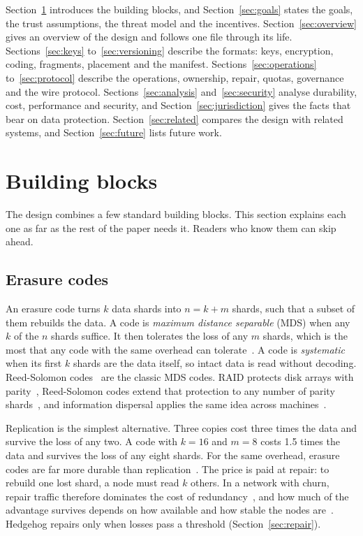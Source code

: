\documentclass[10pt,a4paper,final]{article}
\begin{document}
Section~\ref{sec:background} introduces the building blocks, and Section~\ref{sec:goals} states the goals, the
trust assumptions, the threat model and the incentives. Section~\ref{sec:overview} gives an overview of the design
and follows one file through its life. Sections~\ref{sec:keys} to~\ref{sec:versioning} describe the formats: keys,
encryption, coding, fragments, placement and the manifest. Sections~\ref{sec:operations} to~\ref{sec:protocol}
describe the operations, ownership, repair, quotas, governance and the wire protocol. Sections~\ref{sec:analysis}
and~\ref{sec:security} analyse durability, cost, performance and security, and Section~\ref{sec:jurisdiction} gives
the facts that bear on data protection. Section~\ref{sec:related} compares the design with related systems, and
Section~\ref{sec:future} lists future work.

\section{Building blocks}
\label{sec:background}

The design combines a few standard building blocks. This section explains each one as far as the rest of the paper
needs it. Readers who know them can skip ahead.

\subsection{Erasure codes}

An erasure code turns $k$ data shards into $n = k + m$ shards, such that a subset of them rebuilds the data. A code
is \emph{maximum distance separable} (MDS) when any $k$ of the $n$ shards suffice. It then tolerates the loss of any
$m$ shards, which is the most that any code with the same overhead can tolerate~\cite{macwilliams1977}. A code is
\emph{systematic} when its first $k$ shards are the data itself, so intact data is read without decoding.
Reed-Solomon codes~\cite{reed1960} are the classic MDS codes. RAID protects disk arrays with
parity~\cite{patterson1988}, Reed-Solomon codes extend that protection to any number of parity
shards~\cite{plank1997}, and information dispersal applies the same idea across machines~\cite{rabin1989}.

Replication is the simplest alternative. Three copies cost three times the data and survive the loss of any two. A
code with $k = 16$ and $m = 8$ costs 1.5 times the data and survives the loss of any eight shards. For the same
overhead, erasure codes are far more durable than replication~\cite{weatherspoon2002}. The price is paid at repair:
to rebuild one lost shard, a node must read $k$ others. In a network with churn, repair traffic therefore dominates
the cost of redundancy~\cite{blake2003,dimakis2010}, and how much of the advantage survives depends on how
available and how stable the nodes are~\cite{rodrigues2005}. Hedgehog repairs only when losses pass a threshold
(Section~\ref{sec:repair}).
\end{document}
